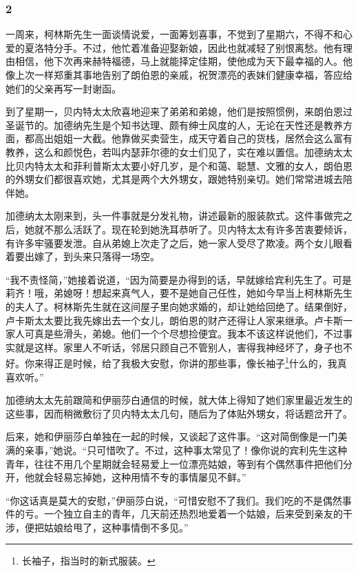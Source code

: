 \subsubsection*{2}

\par 一周来，柯林斯先生一面谈情说爱，一面筹划喜事，不觉到了星期六，不得不和心爱的夏洛特分手。不过，他忙着准备迎娶新娘，因此也就减轻了别恨离愁。他有理由相信，他下次再来赫特福德，马上就能择定佳期，使他成为天下最幸福的人。他像上次一样郑重其事地告别了朗伯恩的亲戚，祝贺漂亮的表妹们健康幸福，答应给她们的父亲再写一封谢函。
\par 到了星期一，贝内特太太欣喜地迎来了弟弟和弟媳，他们是按照惯例，来朗伯恩过圣诞节的。加德纳先生是个知书达理、颇有绅士风度的人，无论在天性还是教养方面，都高出姐姐一大截。他靠做买卖营生，成天守着自己的货栈，居然会这么富有教养，这么和颜悦色，若叫内瑟菲尔德的女士们见了，实在难以置信。加德纳太太比贝内特太太和菲利普斯太太要小好几岁，是个和蔼、聪慧、文雅的女人，朗伯恩的外甥女们都很喜欢她，尤其是两个大外甥女，跟她特别亲切。她们常常进城去陪伴她。
\par 加德纳太太刚来到，头一件事就是分发礼物，讲述最新的服装款式。这件事做完之后，她就不那么活跃了。现在轮到她洗耳恭听了。贝内特太太有许多苦衷要倾诉，有许多牢骚要发泄。自从弟媳上次走了之后，她一家人受尽了欺凌。两个女儿眼看着要出嫁了，到头来只落得一场空。
\par “我不责怪简，”她接着说道，“因为简要是办得到的话，早就嫁给宾利先生了。可是莉齐！哦，弟媳呀！想起来真气人，要不是她自己任性，她如今早当上柯林斯先生的夫人了。柯林斯先生就在这间屋子里向她求婚的，却让她给回绝了。结果倒好，卢卡斯太太要比我先嫁出去一个女儿，朗伯恩的财产还得让人家来继承。卢卡斯一家人可真是些滑头，弟媳。他们一个个尽想捡便宜。我本不该这样说他们，不过事实就是这样。家里人不听话，邻居只顾自己不管别人，害得我神经坏了，身子也不好。你来得正是时候，给了我极大安慰，你讲的那些事，像长袖子\footnote{长袖子，指当时的新式服装。}什么的，我真喜欢听。”
\par 加德纳太太先前跟简和伊丽莎白通信的时候，就大体上得知了她们家里最近发生的这些事，因而稍微敷衍了贝内特太太几句，随后为了体贴外甥女，将话题岔开了。
\par 后来，她和伊丽莎白单独在一起的时候，又谈起了这件事。“这对简倒像是一门美满的亲事，”她说。“只可惜吹了。不过，这种事太常见了！像你说的宾利先生这种青年，往往不用几个星期就会轻易爱上一位漂亮姑娘，等到有个偶然事件把他们分开，他就会轻易忘掉她，这种用情不专的事情屡见不鲜。”
\par “你这话真是莫大的安慰，”伊丽莎白说，“可惜安慰不了我们。我们吃的不是偶然事件的亏。一个独立自主的青年，几天前还热烈地爱着一个姑娘，后来受到亲友的干涉，便把姑娘给甩了，这种事情倒不多见。”

